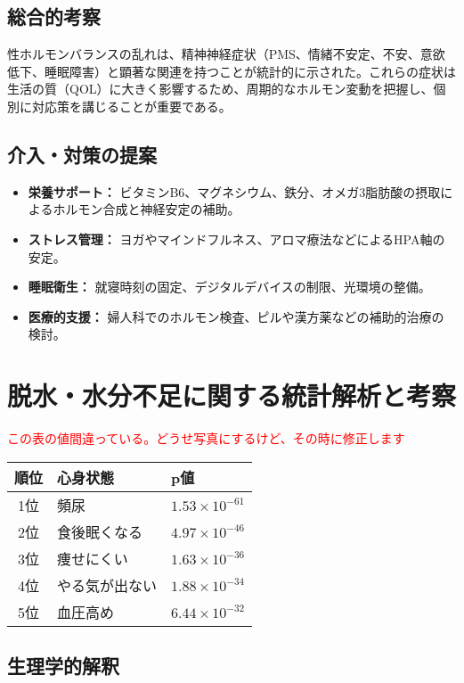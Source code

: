 \documentclass[a4paper,12pt]{article}
\begin{document}
\subsection*{総合的考察}

性ホルモンバランスの乱れは、精神神経症状（PMS、情緒不安定、不安、意欲低下、睡眠障害）と顕著な関連を持つことが統計的に示された。これらの症状は生活の質（QOL）に大きく影響するため、周期的なホルモン変動を把握し、個別に対応策を講じることが重要である。

\subsection*{介入・対策の提案}

\begin{itemize}
  \item \textbf{栄養サポート：} ビタミンB6、マグネシウム、鉄分、オメガ3脂肪酸の摂取によるホルモン合成と神経安定の補助。
  \item \textbf{ストレス管理：} ヨガやマインドフルネス、アロマ療法などによるHPA軸の安定。
  \item \textbf{睡眠衛生：} 就寝時刻の固定、デジタルデバイスの制限、光環境の整備。
  \item \textbf{医療的支援：} 婦人科でのホルモン検査、ピルや漢方薬などの補助的治療の検討。
\end{itemize}


\section{脱水・水分不足に関する統計解析と考察}
\textcolor{red}{この表の値間違っている。どうせ写真にするけど、その時に修正します}
\begin{table}[h]
  \centering
  \begin{tabular}{|c|l|l|}
  \hline
  \textbf{順位} & \textbf{心身状態} & \textbf{p値} \\
  \hline
  1位 & 頻尿 & $1.53 \times 10^{-61}$ \\
  2位 & 食後眠くなる & $4.97 \times 10^{-46}$ \\
  3位 & 痩せにくい & $1.63 \times 10^{-36}$ \\
  4位 & やる気が出ない & $1.88 \times 10^{-34}$ \\
  5位 & 血圧高め & $6.44 \times 10^{-32}$ \\
  \hline
  \end{tabular}
  \end{table}

\subsection*{生理学的解釈}
\end{document}
